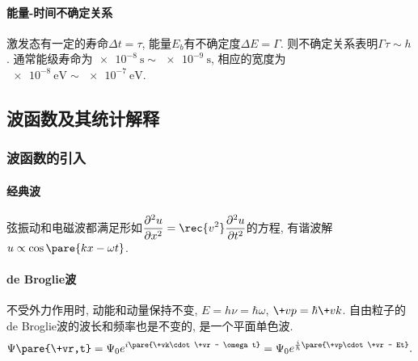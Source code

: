 \documentclass[hidelinks]{ctexart}
\begin{document}
\paragraph{能量-时间不确定关系} %
\label{par:能量_时间不确定关系}

激发态有一定的寿命$\Delta t = \tau$, 能量$E_b$有不确定度$\Delta E = \Gamma$. 则不确定关系表明$\Gamma\tau \sim h$. 通常能级寿命为$\SI{e-8}{\second}\sim\SI{e-9}{\second}$, 相应的宽度为$\SI{e-8}{\eV}\sim \SI{e-7}{\eV}$.




\subsection{波函数及其统计解释} %
\label{sub:波函数及其统计解释}

\subsubsection{波函数的引入} %
\label{ssub:波函数的引入}

\paragraph{经典波} %
\label{par:经典波}

弦振动和电磁波都满足形如$\displaystyle \frac{\partial^2 u}{\partial x^2} = \rec{v^2}\frac{\partial^2 u}{\partial t^2}$的方程, 有谐波解$u \propto \cos\pare{kx - \omega t}$.


\paragraph{de Broglie波} %
\label{par:de_broglie波}

不受外力作用时, 动能和动量保持不变, $E = h\nu = \hbar \omega$, $\+vp = \hbar \+vk$. 自由粒子的de Broglie波的波长和频率也是不变的, 是一个平面单色波.
\[ \Psi\pare{\+vr,t} = \Psi_0 e^{i\pare{\+vk\cdot \+vr - \omega t}} = \Psi_0 e^{\frac{i}{\hbar}\pare{\+vp\cdot \+vr - Et}}. \]

\end{document}
